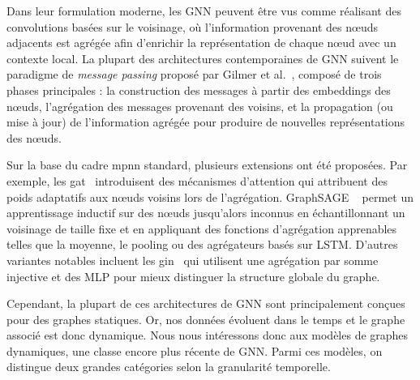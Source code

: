 \documentclass[a4paper,11pt,twoside]{StyleThese}
\begin{document}
Dans leur formulation moderne, les GNN peuvent être vus comme réalisant des convolutions basées sur le voisinage, où l’information provenant des nœuds adjacents est agrégée afin d’enrichir la représentation de chaque nœud avec un contexte local. La plupart des architectures contemporaines de GNN suivent le paradigme de \textit{message passing} proposé par Gilmer et al.~\cite{mpnn}, composé de trois phases principales : la construction des messages à partir des embeddings des nœuds, l’agrégation des messages provenant des voisins, et la propagation (ou mise à jour) de l’information agrégée pour produire de nouvelles représentations des nœuds.

Sur la base du cadre \gls{mpnn} standard, plusieurs extensions ont été proposées. Par exemple, les \gls{gat}~\cite{gat} introduisent des mécanismes d’attention qui attribuent des poids adaptatifs aux nœuds voisins lors de l’agrégation. GraphSAGE ~\cite{graphsage} permet un apprentissage inductif sur des nœuds jusqu’alors inconnus en échantillonnant un voisinage de taille fixe et en appliquant des fonctions d’agrégation apprenables telles que la moyenne, le pooling ou des agrégateurs basés sur LSTM. D’autres variantes notables incluent les \gls{gin}~\cite{gin} qui utilisent une agrégation par somme injective et des MLP pour mieux distinguer la structure globale du graphe.

Cependant, la plupart de ces architectures de GNN sont principalement conçues pour des graphes statiques. Or, nos données évoluent dans le temps et le graphe associé est donc dynamique. Nous nous intéressons donc aux modèles de graphes dynamiques, une classe encore plus récente de GNN. Parmi ces modèles, on distingue deux grandes catégories selon la granularité temporelle.
\end{document}
